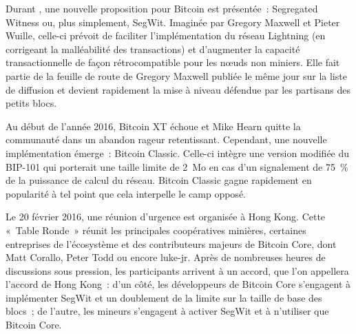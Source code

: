 Durant , une nouvelle proposition pour Bitcoin est présentée~: Segregated Witness ou, plus simplement, SegWit. Imaginée par Gregory Maxwell et Pieter Wuille, celle-ci prévoit de faciliter l'implémentation du réseau Lightning (en corrigeant la malléabilité des transactions) et d'augmenter la capacité transactionnelle de façon rétrocompatible pour les nœuds non miniers. Elle fait partie de la feuille de route de Gregory Maxwell publiée le même jour sur la liste de diffusion et devient rapidement la mise à niveau défendue par les partisans des petits blocs.

Au début de l'année 2016, Bitcoin XT échoue et Mike Hearn quitte la communauté dans un abandon rageur retentissant. Cependant, une nouvelle implémentation émerge~: Bitcoin Classic. Celle-ci intègre une version modifiée du BIP-101 qui porterait une taille limite de 2~Mo en cas d'un signalement de 75~\% de la puissance de calcul du réseau. Bitcoin Classic gagne rapidement en popularité à tel point que cela interpelle le camp opposé.

Le 20 février 2016, une réunion d'urgence est organisée à Hong Kong. Cette «~Table Ronde~» réunit les principales coopératives minières, certaines entreprises de l'écosystème et des contributeurs majeurs de Bitcoin Core, dont Matt Corallo, Peter Todd ou encore luke-jr. Après de nombreuses heures de discussions sous pression, les participants arrivent à un accord, que l'on appellera l'accord de Hong Kong~: d'un côté, les développeurs de Bitcoin Core s'engagent à implémenter SegWit et un doublement de la limite sur la taille de base des blocs~; de l'autre, les mineurs s'engagent à activer SegWit et à n'utiliser que Bitcoin Core.

